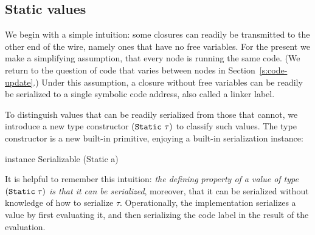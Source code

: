 \documentclass[preprint]{sigplanconf}
\begin{document}
\subsection{Static values}

We begin with a simple intuition: some closures can readily be
transmitted to the other end of the wire, namely ones that have no
free variables.  For the present we make a simplifying assumption,
that every node is running the same code.  (We return to the question
of code that varies between nodes in Section~\ref{s:code-update}.)
Under this assumption, a closure without free variables can be
readily be serialized to a single symbolic code address, also called a linker label.

To distinguish values that can be readily serialized from those that cannot, we introduce a new type constructor
$(\text{\tt Static}~\tau)$ to classify such values.  The type 
constructor  is a new built-in primitive, 
enjoying a built-in serialization instance:
\begin{code}
  instance Serializable (Static a)
\end{code}
It is helpful to remember this intuition: \emph{the defining property of
a value of type $(\text{\tt Static}\;\tau)$ is that it can be serialized},
moreover, that it can be serialized without knowledge of how to serialize $\tau$.
Operationally, the implementation serializes a  value by first evaluating it,
and then serializing the code label in the result of the evaluation.  
\end{document}
